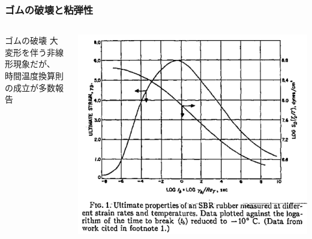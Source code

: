 \documentclass[12pt, dvipdfmx]{beamer}
\begin{document}
\begin{frame}
	\frametitle{ゴムの破壊と粘弾性}
		
		\vspace{2mm}
		\begin{columns}[T, totalwidth=\textwidth]
                \begin{alertblock}{ゴムの破壊}
                    大変形を伴う非線形現象だが、\\時間温度換算則の成立が多数報告
                \end{alertblock}

				\includegraphics[width=.8\textwidth]{Time_Temp_2.png}
		\end{columns}
\end{frame}

    
    
    
\end{document}
